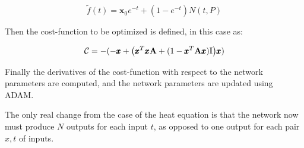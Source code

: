 \documentclass[reprint, english, nofootinbib]{revtex4-2}
\begin{document}
\begin{equation}
    \tilde f(t) = \pmb x_0 e^{-t} + (1 - e^{-t}) N(t, P)
\end{equation}

Then the cost-function to be optimized is defined, in this case as:

\begin{equation}
    \mathcal C =  - (- \pmb x + \qty(\pmb x^T\pmb x \mathbf{A} + (1 - \pmb x^T \mathbf{A} \pmb x) \mathbb I) \pmb x)
\end{equation}

Finally the derivatives of the cost-function with respect to the network parameters are computed, and the network parameters are updated using ADAM.

The only real change from the case of the heat equation is that the network now must produce $N$ outputs for each input $t$, as opposed to one output for each pair $x,t$ of inputs.
\end{document}
